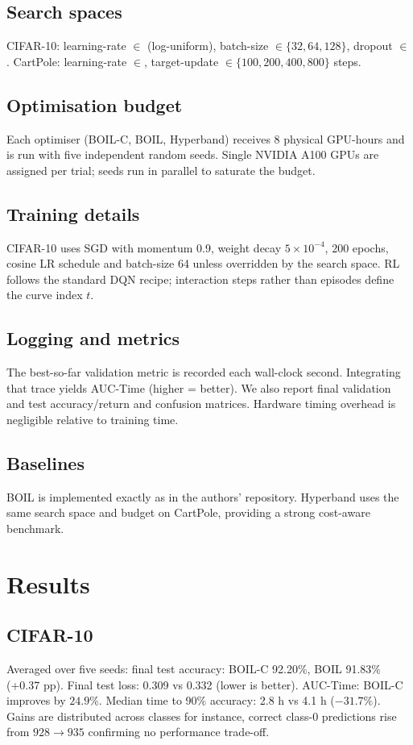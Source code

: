\documentclass{article} %
\begin{document}
\subsection{Search spaces}
CIFAR-10: learning-rate \(\in\) (log-uniform), batch-size \(\in\{32,64,128\}\), dropout \(\in\). CartPole: learning-rate \(\in\), target-update \(\in\{100,200,400,800\}\) steps.

\subsection{Optimisation budget}
Each optimiser (BOIL-C, BOIL, Hyperband) receives 8 physical GPU-hours and is run with five independent random seeds. Single NVIDIA A100 GPUs are assigned per trial; seeds run in parallel to saturate the budget.

\subsection{Training details}
CIFAR-10 uses SGD with momentum 0.9, weight decay \(5\times 10^{-4}\), 200 epochs, cosine LR schedule and batch-size 64 unless overridden by the search space. RL follows the standard DQN recipe; interaction steps rather than episodes define the curve index \(t\).

\subsection{Logging and metrics}
The best-so-far validation metric is recorded each wall-clock second. Integrating that trace yields AUC-Time (higher = better). We also report final validation and test accuracy/return and confusion matrices. Hardware timing overhead is negligible relative to training time.

\subsection{Baselines}
BOIL is implemented exactly as in the authors' repository. Hyperband uses the same search space and budget on CartPole, providing a strong cost-aware benchmark.

\section{Results}\label{sec:results}%
\subsection{CIFAR-10}
Averaged over five seeds: final test accuracy: BOIL-C 92.20\%, BOIL 91.83\% (+0.37 pp). Final test loss: 0.309 vs 0.332 (lower is better). AUC-Time: BOIL-C improves by \(24.9\%\). Median time to 90\% accuracy: 2.8 h vs 4.1 h (\(-31.7\%\)). Gains are distributed across classes for instance, correct class-0 predictions rise from \(928\rightarrow 935\) confirming no performance trade-off.
\end{document}

